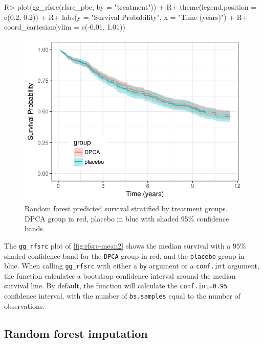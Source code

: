 \documentclass[article]{jss}
\begin{document}
\begin{Schunk}
\begin{Sinput}
R> plot(gg_rfsrc(rfsrc_pbc, by = "treatment")) +
R+   theme(legend.position = c(0.2, 0.2)) +
R+   labs(y = "Survival Probability", x = "Time (years)") +
R+   coord_cartesian(ylim = c(-0.01, 1.01))
\end{Sinput}
\begin{figure}[!htb]

{\centering \includegraphics{rfs-rfsrc-mean2-1} 

}

\caption[Random forest predicted survival stratified by treatment groups]{Random forest predicted survival stratified by treatment groups. DPCA group in red, placebo in blue with shaded 95\% confidence bands.}\label{fig:rfsrc-mean2}
\end{figure}
\end{Schunk}

The \texttt{gg\_rfsrc} plot of \autoref{fig:rfsrc-mean2} shows the
median survival with a \(95\%\) shaded confidence band for the
\texttt{DPCA} group in red, and the \texttt{placebo} group in blue. When
calling \texttt{gg\_rfsrc} with either a \texttt{by} argument or a
\texttt{conf.int} argument, the function calculates a bootstrap
confidence interval around the median survival line. By default, the
function will calculate the \texttt{conf.int=0.95} confidence interval,
with the number of \texttt{bs.samples} equal to the number of
observations.

\subsection{Random forest imputation}\label{random-forest-imputation}
\end{document}
